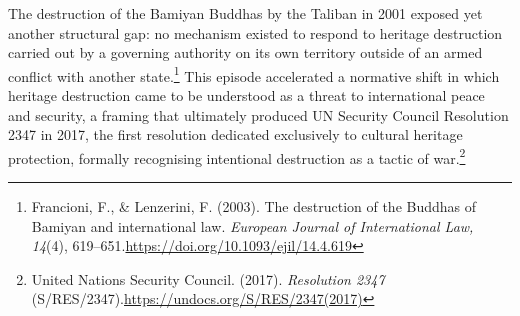 The destruction of the Bamiyan Buddhas by the Taliban in 2001 exposed yet another structural gap: no mechanism existed to respond to heritage destruction carried out by a governing authority on its own territory outside of an armed conflict with another state.\footnote{Francioni, F., \& Lenzerini, F. (2003). The destruction of the Buddhas of Bamiyan and international law. \emph{European Journal of International Law, 14}(4), 619–651.\url{https://doi.org/10.1093/ejil/14.4.619}} This episode accelerated a normative shift in which heritage destruction came to be understood as a threat to international peace and security, a framing that ultimately produced UN Security Council Resolution 2347 in 2017, the first resolution dedicated exclusively to cultural heritage protection, formally recognising intentional destruction as a tactic of war.\footnote{United Nations Security Council. (2017). \emph{Resolution 2347} (S/RES/2347).\url{https://undocs.org/S/RES/2347(2017)}}
